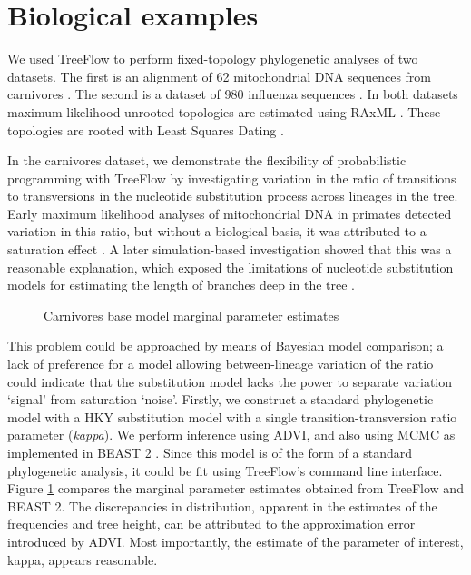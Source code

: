 \section{Biological examples}

We used TreeFlow to perform fixed-topology phylogenetic analyses of two datasets. The first is an alignment of 62 mitochondrial DNA sequences from carnivores \cite{suchard2009many}. The second is a dataset of 980 influenza sequences \cite{vaughan2014efficient}. In both datasets maximum likelihood unrooted topologies are estimated using RAxML \cite{stamatakis2014raxml}. These topologies are rooted with Least Squares Dating \cite{to2016lsd}.

In the carnivores dataset, we demonstrate the flexibility of probabilistic programming with TreeFlow by investigating variation in the ratio of transitions to transversions in the nucleotide substitution process across lineages in the tree. Early maximum likelihood analyses of mitochondrial DNA in primates detected variation in this ratio, but without a biological basis, it was attributed to a saturation effect \cite{yang1999estimation}. A later simulation-based investigation showed that this was a reasonable explanation, which exposed the limitations of nucleotide substitution models for estimating the length of branches deep in the tree \cite{duchene2015declining}.

\begin{figure}
    \centering
    \caption{Carnivores base model marginal parameter estimates}
    \label{fig:carnivoresmarginals}
\end{figure}

This problem could be approached by means of Bayesian model comparison; a lack of preference for a model allowing between-lineage variation of the ratio could indicate that the substitution model lacks the power to separate variation `signal' from saturation `noise'. Firstly, we construct a standard phylogenetic model with a HKY substitution model with a single transition-transversion ratio parameter (\textit{kappa}). We perform inference using ADVI, and also using MCMC as implemented in BEAST 2 \cite{bouckaert2019beast}. Since this model is of the form of a standard phylogenetic analysis, it could be fit using TreeFlow's command line interface. Figure \ref{fig:carnivoresmarginals} compares the marginal parameter estimates obtained from TreeFlow and BEAST 2. The discrepancies in distribution, apparent in the estimates of the frequencies and tree height, can be attributed to the approximation error introduced by ADVI. Most importantly, the estimate of the parameter of interest, kappa, appears reasonable.

